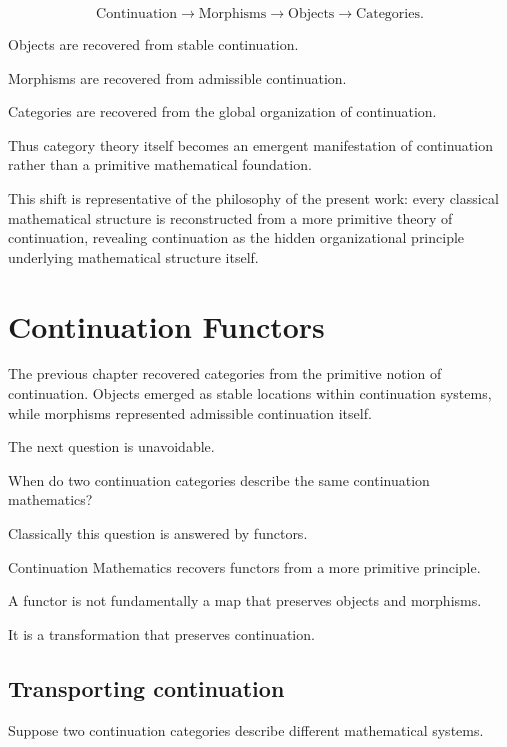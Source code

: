 \documentclass[13pt,openany]{book}
\theoremstyle{plain}
\theoremstyle{definition}
\begin{document}
\[
\text{Continuation}
\longrightarrow
\text{Morphisms}
\longrightarrow
\text{Objects}
\longrightarrow
\text{Categories}.
\]

Objects are recovered from stable continuation.

Morphisms are recovered from admissible continuation.

Categories are recovered from the global organization of continuation.

Thus category theory itself becomes an emergent manifestation of continuation
rather than a primitive mathematical foundation.

This shift is representative of the philosophy of the present work: every
classical mathematical structure is reconstructed from a more primitive theory
of continuation, revealing continuation as the hidden organizational principle
underlying mathematical structure itself.

\chapter{Continuation Functors}

The previous chapter recovered categories from the primitive notion of
continuation. Objects emerged as stable locations within continuation systems,
while morphisms represented admissible continuation itself.

The next question is unavoidable.

When do two continuation categories describe the same continuation mathematics?

Classically this question is answered by functors.

Continuation Mathematics recovers functors from a more primitive principle.

A functor is not fundamentally a map that preserves objects and morphisms.

It is a transformation that preserves continuation.

\section{Transporting continuation}

Suppose two continuation categories describe different mathematical systems.
\end{document}
